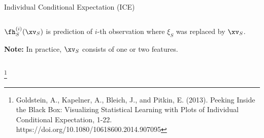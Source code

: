 \documentclass[11pt,compress,t,notes=noshow, aspectratio=169, xcolor=table]{beamer}
\begin{document}
\begin{frame}{Individual Conditional Expectation (ICE)}
\begin{columns}[T]
\begin{column}{0.82\textwidth}
$\fh_{S}^{(i)}(\xv_S)$ is prediction of $i$-th observation where $\xi_S$ was replaced by $\xv_S$.

\textbf{Note:} In practice, $\xv_S$ consists of one or two features.

\end{column}
\end{columns}



%
\footnote[frame]{Goldstein, A., Kapelner, A., Bleich, J., and Pitkin, E. (2013). Peeking Inside the Black Box: Visualizing Statistical Learning with Plots of Individual Conditional Expectation, 1-22. https://doi.org/10.1080/10618600.2014.907095}
\end{frame}

%
%
%
\end{document}
